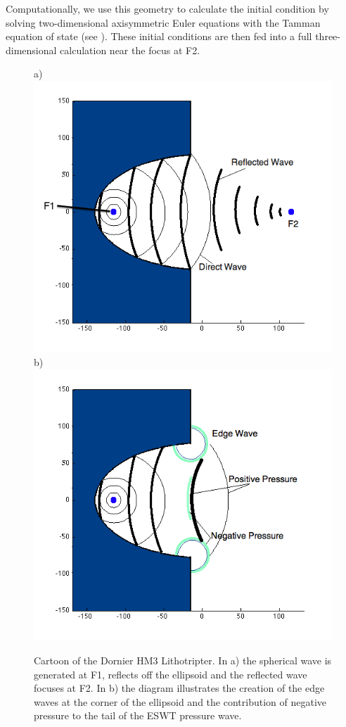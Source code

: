 Computationally, we
use this geometry to calculate the initial condition by solving
two-dimensional axisymmetric Euler equations with the Tamman equation of
state (see ).   These initial conditions are then fed into a full 
three-dimensional calculation near the focus at F2.

\begin{figure}
\begin{center}
a) \includegraphics[scale=0.35]{lithotripter_schematic.png}\hspace{1mm}
b) \includegraphics[scale=0.35]{lithotripter_edge_wave.png}
\end{center}
\caption{Cartoon of the Dornier HM3 Lithotripter.  In a) the spherical wave is generated at F1, reflects off the ellipsoid and the reflected wave focuses at F2.  In b) the diagram illustrates the creation of the edge waves at the corner of the ellipsoid and the contribution of negative pressure to the tail of the ESWT pressure wave.}
\label{fig:hm3_diagram}
\end{figure}

